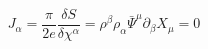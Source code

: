 \begin{equation}
J_{\alpha}= \frac{\pi}{2e}\frac{\delta S}{\delta \chi^{\alpha}}=\rho^{\beta}
\rho_{\alpha}\bar{\Psi}^{\mu}
\partial_{\beta}X_{\mu}=0
\end{equation}

